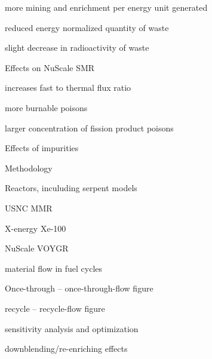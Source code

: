 \documentclass{report}
\begin{document}
\begin{outline}
\begin{outline}
\begin{outline}
\begin{outline}
            \item more mining and enrichment per energy unit generated
            \item reduced energy normalized quantity of waste
            \item slight decrease in radioactivity of waste
        \end{outline}
        \item Effects on NuScale SMR \cite{carlson_implications_2022}
        \begin{outline}
            \item increases fast to thermal flux ratio
            \item more burnable poisons
            \item larger concentration of fission product poisons
        \end{outline}
        \item Effects of impurities \cite{celikten_effects_2021}
    \end{outline}
\end{outline}

\item Methodology
\begin{outline}
    \item Reactors, inculuding serpent models
    \begin{outline}
        \item USNC MMR \cite{hussain_advances_2018}
        \item X-energy Xe-100 \cite{harlan_x-energy_2018}
        \item NuScale VOYGR \cite{nuscale_chapter_2018}
    \end{outline}
    \item material flow in fuel cycles
    \begin{outline}
        \item Once-through -- once-through-flow figure
        \item recycle -- recycle-flow figure
    \end{outline}
    \item sensitivity analysis and optimization
    \item downblending/re-enriching effects
\end{outline}


\end{outline}
\end{document}
